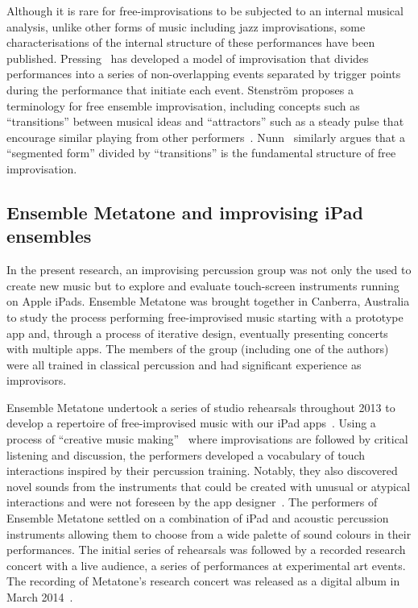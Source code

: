 \documentclass[graybox]{svmult}
\begin{document}
Although it is rare for free-improvisations to be subjected to an
internal musical analysis, unlike other forms of music including jazz
improvisations, some characterisations of the internal structure of
these performances have been published.
Pressing~\cite{Pressing:1988uo} has developed a model of improvisation
that divides performances into a series of non-overlapping events
separated by trigger points during the performance that initiate each
event. Stenstr\"om proposes a terminology for free ensemble
improvisation, including concepts such as ``transitions'' between
musical ideas and ``attractors'' such as a steady pulse that encourage
similar playing from other performers~\cite{Stenstrom:2009xy}.
Nunn~\cite{Nunn:1998ly} similarly argues that a ``segmented form''
divided by ``transitions'' is the fundamental structure of free
improvisation.

\subsection{Ensemble Metatone and improvising iPad ensembles}

In the present research, an improvising percussion group was not only
the used to create new music but to explore and evaluate touch-screen
instruments running on Apple iPads. Ensemble Metatone was brought
together in Canberra, Australia to study the process performing
free-improvised music starting with a prototype app and, through a
process of iterative design, eventually presenting concerts with
multiple apps. The members of the group (including one of the authors)
were all trained in classical percussion and had significant
experience as improvisors.

Ensemble Metatone undertook a series of studio rehearsals throughout
2013 to develop a repertoire of free-improvised music with our iPad
apps~\cite{Martin:2014jk}. Using a process of ``creative music
making''~\cite{Cahn:2005uq} where improvisations are followed by
critical listening and discussion, the performers developed a
vocabulary of touch interactions inspired by their percussion
training. Notably, they also discovered novel sounds from the
instruments that could be created with unusual or atypical
interactions and were not foreseen by the app
designer~\cite{Martin:2014cr}. The performers of Ensemble Metatone
settled on a combination of iPad and acoustic percussion instruments
allowing them to choose from a wide palette of sound colours in their
performances. The initial series of rehearsals was followed by a
recorded research concert with a live audience, a series of
performances at experimental art events. The recording of Metatone's
research concert was released as a digital album in March
2014~\cite{Ensemble-Metatone:2014sf}.
\end{document}
